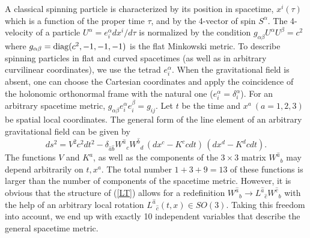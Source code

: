 \documentclass[preprint,showpacs,preprintnumbers,eqsecnum,amsmath,amssymb]{revtex4}
\begin{document}
A classical spinning particle is characterized by its position in
spacetime, $x^i(\tau)$ which is a function of the proper time
$\tau$, and by the 4-vector of spin $S^\alpha$. The 4-velocity of
a particle $U^\alpha = e^\alpha_i dx^i/d\tau$ is normalized by the
condition $g_{\alpha\beta}U^\alpha U^\beta = c^2$ where
$g_{\alpha\beta} = {\rm diag}(c^2, -1, -1, -1)$ is the flat Minkowski metric. 
To describe spinning particles 
in flat and curved spacetimes (as well as in arbitrary curvilinear
coordinates), we use the tetrad $e^\alpha_i$. When the
gravitational field is absent, one can choose the Cartesian
coordinates and apply the coincidence of the holonomic orthonormal
frame with the natural one ($e^\alpha_i = \delta^\alpha_i$). For
an arbitrary spacetime metric, $g_{\alpha\beta}e^\alpha_ie^\beta_i
= g_{ij}$. Let $t$ be the time and $x^a~ (a=1,2,3)$ be spatial
local coordinates. The general form of the line element of an
arbitrary gravitational field can be given by
\begin{equation}\label{LT}
ds^2 = V^2c^2dt^2 - \delta_{\widehat{a}\widehat{b}}W^{\widehat
a}{}_c W^{\widehat b}{}_d\,(dx^c - K^ccdt)\,(dx^d - K^dcdt).
\end{equation}
The functions $V$ and $K^a$, as well as the components of the
$3\times 3$ matrix $W^{\widehat a}{}_b$ may depend arbitrarily on
$t,x^a$. The total number $1+3+9=13$ of these functions is larger
than the number of components of the spacetime metric. However, it
is obvious that the structure of (\ref{LT}) allows for a
redefinition $W^{\widehat a}{}_b\longrightarrow L^{\widehat a}
{}_{\widehat c}W^{\widehat c}{}_b$ with the help of an arbitrary
local rotation $L^{\widehat a}{}_{\widehat c}(t,x)\in SO(3)$.
Taking this freedom into account, we end up with exactly 10
independent variables that describe the general spacetime metric.
\end{document}
